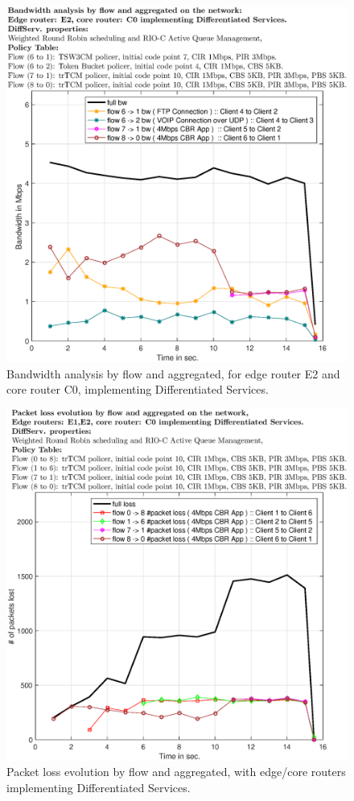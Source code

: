 \documentclass[conference,compsoc]{IEEEtran}
\begin{document}
\begin{figure}[H]
     \centering
     \includegraphics[width=1\columnwidth]{EPS/C/bw_c5_e2.eps}
     \caption{Bandwidth analysis by flow and aggregated, for edge router E2 and core router C0, implementing Differentiated Services.}
     \label{graph:bw_c5_e2}
     \end{figure}
     

     \begin{figure}[H]
     \centering
     \includegraphics[width=1\columnwidth]{EPS/C/loss_c5.eps}
     \caption{Packet loss evolution by flow and aggregated, with edge/core routers implementing Differentiated Services.}
     \label{graph:loss_c5}
     \end{figure} 
     
\end{document}

